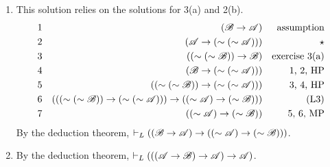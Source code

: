 \begin{enumerate}
\begin{enumerate}[label=(\alph*), align=left]
      \item This solution relies on the solutions for 3(a) and 2(b).
        \begin{align*}
          \text{1}&&
          (\mathscr{B} \rightarrow \mathscr{A})&&
          \text{assumption}\\
          \text{2}&&
          (\mathscr{A} \rightarrow (\sim(\sim\mathscr{A})))&&
          \star\\
          \text{3}&&
          ((\sim(\sim\mathscr{B})) \rightarrow \mathscr{B})&&
          \text{exercise 3(a)}\\
          \text{4}&&
          (\mathscr{B} \rightarrow (\sim(\sim\mathscr{A})))&&
          \text{1, 2, HP}\\
          \text{5}&&
          ((\sim(\sim\mathscr{B})) \rightarrow (\sim(\sim\mathscr{A})))&&
          \text{3, 4, HP}\\
          \text{6}&&
          (((\sim(\sim\mathscr{B})) \rightarrow (\sim(\sim\mathscr{A}))) \rightarrow ((\sim\mathscr{A}) \rightarrow (\sim\mathscr{B})))&&
          \text{(L3)}\\
          \text{7}&&
          ((\sim\mathscr{A}) \rightarrow (\sim\mathscr{B}))&&
          \text{5, 6, MP}
        \end{align*}
        By the deduction theorem, \(\vdash_{L} ((\mathscr{B} \rightarrow \mathscr{A}) \rightarrow ((\sim\mathscr{A}) \rightarrow (\sim\mathscr{B})))\).

      \item

        By the deduction theorem, \(\vdash_{L} (((\mathscr{A} \rightarrow \mathscr{B}) \rightarrow \mathscr{A}) \rightarrow \mathscr{A})\).
        

\end{enumerate}
\end{enumerate}
